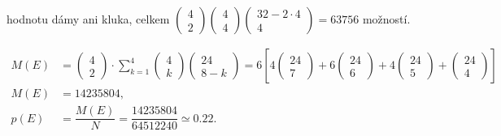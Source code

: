 \begin{example}
\begin{enumerate}
          hodnotu dámy ani kluka, celkem 
          \(\begin{pmatrix} 4 \\ 2 \end{pmatrix}
            \begin{pmatrix} 4 \\ 4\end{pmatrix}
            \begin{pmatrix} 32-2\cdot4 \\ 4 \end{pmatrix} = \num{63756}\) možností.
    \end{enumerate}
    \begin{align*}
      M(E) &= \begin{pmatrix} 4 \\ 2 \end{pmatrix}\cdot\sum^{4}_{k=1}
              \begin{pmatrix} 4 \\ k \end{pmatrix}\begin{pmatrix} 24 \\ 8 - k \end{pmatrix}
            = 6\left[ 
                  4\begin{pmatrix} 24 \\ 7 \end{pmatrix} +
                  6\begin{pmatrix} 24 \\ 6 \end{pmatrix} +
                  4\begin{pmatrix} 24 \\ 5 \end{pmatrix} +
                   \begin{pmatrix} 24 \\ 4 \end{pmatrix}
                \right]                                                       \\ 
      M(E) &= \num{14235804},                                                 \\
      p(E) &= \dfrac{M(E)}{N} = \dfrac{\num{14235804}}{\num{64512240}} \simeq \num{0.22}.
    \end{align*}
    

\end{example}
